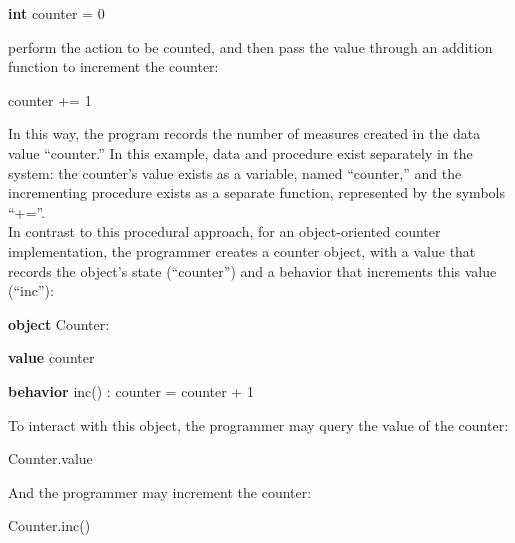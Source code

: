 \begin{ttfamily}
\begin{scriptsize}
\textbf{int} counter = 0
\end{scriptsize}
\end{ttfamily}

\noindent perform the action to be counted, and then pass the value through an addition function to increment the counter:

\begin{ttfamily}
\begin{scriptsize}
counter += 1
\end{scriptsize}
\end{ttfamily}

\noindent In this way, the program records the number of measures created in the data value ``counter.'' In this example, data and procedure exist separately in the system: the counter's value exists as a variable, named ``counter,'' and the incrementing procedure exists as a separate function, represented by the symbols ``+=''.
\\
In contrast to this procedural approach, for an object-oriented counter implementation, the programmer creates a counter object, with a value that records the object's state (``counter'') and a behavior that increments this value (``inc''):

\begin{ttfamily}
\begin{scriptsize}
\textbf{object} Counter:

   \textbf{value} counter

   \textbf{behavior} inc() : counter = counter + 1 
\end{scriptsize}
\end{ttfamily}

\noindent To interact with this object, the programmer may query the value of the counter:

\begin{ttfamily}
\begin{scriptsize}
Counter.value
\end{scriptsize}
\end{ttfamily}

\noindent And the programmer may increment the counter:

\begin{ttfamily}
\begin{scriptsize}
Counter.inc()
\end{scriptsize}
\end{ttfamily}
